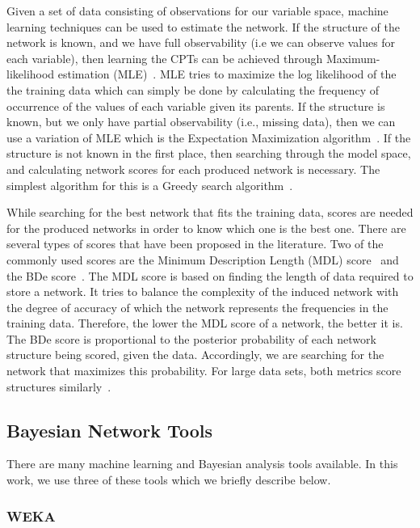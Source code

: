 \documentclass[10pt,twocolumn,letterpaper]{article}
\begin{document}
Given a set of data consisting of observations for our variable space, machine learning techniques can be used to estimate the network. If the structure of the
network is known, and we have full observability (i.e we can observe values for each variable), then learning the CPTs can be achieved through
Maximum-likelihood estimation (MLE)~\cite{benbayesian}. MLE tries to maximize the log likelihood of the the training data which can simply be done by
calculating the frequency of occurrence of the values of each variable given its parents. If the structure is known, but we only have partial observability
(i.e., missing data), then we can use a variation of MLE which is the Expectation Maximization algorithm~\cite{dempster1977maximum}. If the structure is not
known in
the first place, then searching through the model space, and calculating network scores for each produced network is necessary. The simplest algorithm for this
is a Greedy search algorithm~\cite{friedman1996learning}.

While searching for the best network that fits the training data, scores are needed for the produced networks in order to know which one is the best one. There
are several types of scores that have been proposed in the literature. Two of the commonly used scores are the Minimum Description Length (MDL)
score~\cite{rissanen1986stochastic} and the BDe score~\cite{heckerman1995learning}. The MDL score is based on finding the length of data required to store a
network. It tries to balance the complexity of the induced network with the degree of accuracy of which the network represents the frequencies in the training
data. Therefore, the lower the MDL score of a network, the better it is. The BDe score is proportional to the posterior probability of each network structure
being scored, given the data. Accordingly, we are searching for the network that maximizes this probability. For large data sets, both metrics score
structures similarly~\cite{friedman1996learning}. 

\subsection{Bayesian Network Tools}

There are many machine learning and Bayesian analysis tools available. In this work, we use three of these tools which we briefly describe
below.

\subsubsection{WEKA}
\end{document}
